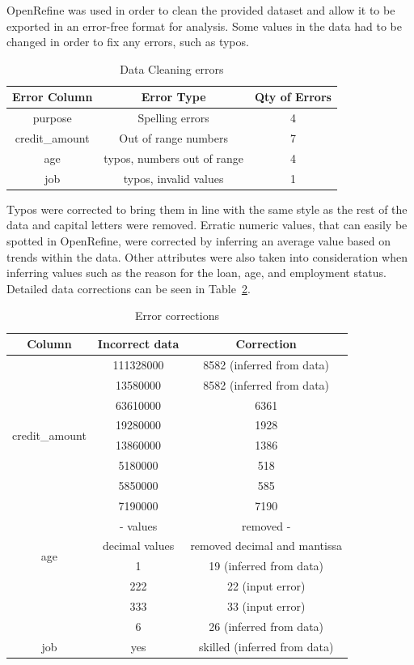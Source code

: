 \documentclass[12pt]{article}
\begin{document}
OpenRefine was used in order to clean the provided dataset and allow it to be exported in an error-free format for analysis.
Some values in the data had to be changed in order to fix any errors, such as typos. 

\begin{table}[h!]
\centering
\begin{tabular}{|c|c|c|}
\hline
\multicolumn{1}{|l|}{Error Column} & Error Type & \multicolumn{1}{r|}{Qty of Errors} \\ \hline
purpose & Spelling errors & 4 \\
credit\_amount & Out of range numbers & 7 \\
age & typos, numbers out of range & 4 \\
job & typos, invalid values & 1 \\ \hline
\end{tabular}
\caption{Data Cleaning errors}
\label{fig:data_cleaning}
\end{table}

Typos were corrected to bring them in line with the same style as the rest of the data and capital letters were removed. Erratic numeric values, that can easily be spotted in OpenRefine, were corrected by inferring an average value based on trends within the data. Other attributes were also taken into consideration when inferring values such as the reason for the loan, age, and employment status. Detailed data corrections can be seen in Table~\ref{fig:error_corrections}.

\begin{table}
\centering
\begin{tabular}{|c|c|c|}
\hline
Column & Incorrect data & Correction \\ \hline
\multirow{8}{*}{credit\_amount} & 111328000 & 8582 (inferred from data) \\
 & 13580000 & 8582 (inferred from data) \\
 & 63610000 & 6361 \\
 & 19280000 & 1928 \\
 & 13860000 & 1386 \\
 & 5180000 & 518 \\
 & 5850000 & 585 \\
 & 7190000 & 7190 \\ \hline
\multirow{4}{*}{age} & - values & removed - \\
 & decimal values & removed decimal and mantissa \\
 & 1 & 19 (inferred from data) \\
 & 222 & 22 (input error) \\
 & 333 & 33 (input error) \\
 & 6 & 26 (inferred from data) \\ \hline
job & yes & skilled (inferred from data) \\ \hline
\end{tabular}
\caption{Error corrections}
\label{fig:error_corrections}
\end{table}
\end{document}
